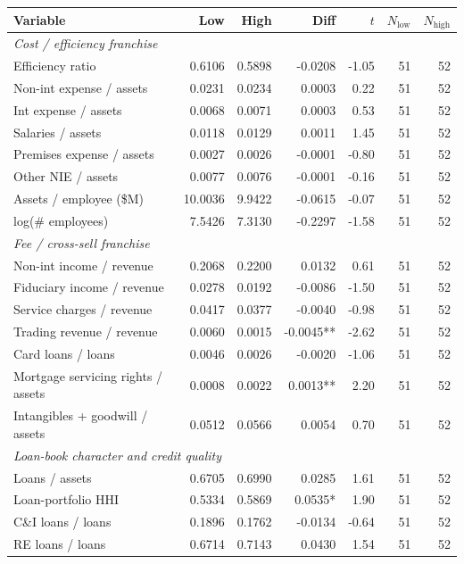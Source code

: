 \begin{tabular}{lrrrrrr}
\toprule
Variable & Low & High & Diff & $t$ & $N_{\text{low}}$ & $N_{\text{high}}$ \\
\midrule
\multicolumn{7}{l}{\emph{Cost / efficiency franchise}} \\
\midrule
Efficiency ratio & 0.6106 & 0.5898 & -0.0208 & -1.05 & 51 & 52 \\
Non-int expense / assets & 0.0231 & 0.0234 & 0.0003 & 0.22 & 51 & 52 \\
Int expense / assets & 0.0068 & 0.0071 & 0.0003 & 0.53 & 51 & 52 \\
Salaries / assets & 0.0118 & 0.0129 & 0.0011 & 1.45 & 51 & 52 \\
Premises expense / assets & 0.0027 & 0.0026 & -0.0001 & -0.80 & 51 & 52 \\
Other NIE / assets & 0.0077 & 0.0076 & -0.0001 & -0.16 & 51 & 52 \\
Assets / employee (\$M) & 10.0036 & 9.9422 & -0.0615 & -0.07 & 51 & 52 \\
log(\# employees) & 7.5426 & 7.3130 & -0.2297 & -1.58 & 51 & 52 \\
\midrule
\multicolumn{7}{l}{\emph{Fee / cross-sell franchise}} \\
\midrule
Non-int income / revenue & 0.2068 & 0.2200 & 0.0132 & 0.61 & 51 & 52 \\
Fiduciary income / revenue & 0.0278 & 0.0192 & -0.0086 & -1.50 & 51 & 52 \\
Service charges / revenue & 0.0417 & 0.0377 & -0.0040 & -0.98 & 51 & 52 \\
Trading revenue / revenue & 0.0060 & 0.0015 & -0.0045** & -2.62 & 51 & 52 \\
Card loans / loans & 0.0046 & 0.0026 & -0.0020 & -1.06 & 51 & 52 \\
Mortgage servicing rights / assets & 0.0008 & 0.0022 & 0.0013** & 2.20 & 51 & 52 \\
Intangibles + goodwill / assets & 0.0512 & 0.0566 & 0.0054 & 0.70 & 51 & 52 \\
\midrule
\multicolumn{7}{l}{\emph{Loan-book character and credit quality}} \\
\midrule
Loans / assets & 0.6705 & 0.6990 & 0.0285 & 1.61 & 51 & 52 \\
Loan-portfolio HHI & 0.5334 & 0.5869 & 0.0535* & 1.90 & 51 & 52 \\
C\&I loans / loans & 0.1896 & 0.1762 & -0.0134 & -0.64 & 51 & 52 \\
RE loans / loans & 0.6714 & 0.7143 & 0.0430 & 1.54 & 51 & 52 \\

\end{tabular}
